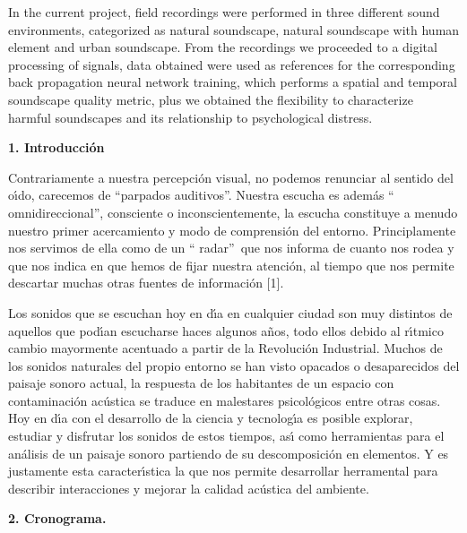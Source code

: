 In the current project, field recordings were performed in three different
sound environments, categorized as natural soundscape, natural soundscape with
human element and urban soundscape. From the recordings we proceeded to a
digital processing of signals, data obtained were used as references for the
corresponding back propagation neural network training, which performs a
spatial and temporal soundscape quality metric, plus we obtained the
flexibility to characterize harmful soundscapes and its relationship to
psychological distress.

\textbf{1. Introducci\'{o}n}

Contrariamente a nuestra percepci\'{o}n visual, no podemos renunciar al
sentido del o\'{\i}do, carecemos de \textquotedblleft parpados
auditivos\textquotedblright. Nuestra escucha es adem\'{a}s \textquotedblleft
omnidireccional\textquotedblright, consciente o inconscientemente, la escucha
constituye a menudo nuestro primer acercamiento y modo de comprensi\'{o}n del
entorno. Principlamente nos servimos de ella como de un \textquotedblleft
radar\textquotedblright\ que nos informa de cuanto nos rodea y que nos indica
en que hemos de fijar nuestra atenci\'{o}n, al tiempo que nos permite
descartar muchas otras fuentes de informaci\'{o}n [1].

Los sonidos que se escuchan hoy en d\'{\i}a en cualquier ciudad son muy
distintos de aquellos que pod\'{\i}an escucharse haces algunos a\~{n}os, todo
ellos debido al r\'{\i}tmico cambio mayormente acentuado a partir de la
Revoluci\'{o}n Industrial. Muchos de los sonidos naturales del propio entorno
se han visto opacados o desaparecidos del paisaje sonoro actual, la respuesta
de los habitantes de un espacio con contaminaci\'{o}n ac\'{u}stica se traduce
en malestares psicol\'{o}gicos entre otras cosas. Hoy en d\'{\i}a con el
desarrollo de la ciencia y tecnolog\'{\i}a es posible explorar, estudiar y
disfrutar los sonidos de estos tiempos, as\'{\i} como herramientas para el
an\'{a}lisis de un paisaje sonoro partiendo de su descomposici\'{o}n en
elementos. Y es justamente esta caracter\'{\i}stica la que nos permite
desarrollar herramental para describir interacciones y mejorar la calidad
ac\'{u}stica del ambiente.

\textbf{2. Cronograma.}


